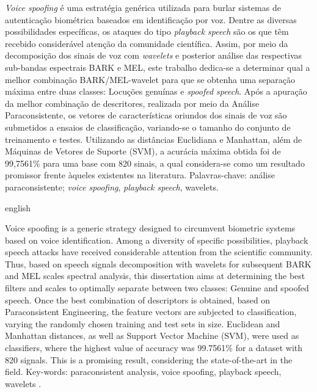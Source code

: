 \begin{resumo}
	\par \textit{Voice spoofing} é uma estratégia genérica utilizada para burlar sistemas de autenticação biométrica baseados em identificação por voz. Dentre as diversas possibilidades específicas, os ataques do tipo \textit{playback speech} são os que têm recebido considerável atenção da comunidade científica. Assim, por meio da decomposição dos sinais de voz com \textit{wavelets} e posterior análise das respectivas sub-bandas espectrais BARK e MEL, este trabalho dedica-se a determinar qual a melhor combinação BARK/MEL-wavelet para que se obtenha uma separação máxima entre duas classes: Locuções genuínas e \textit{spoofed speech}. Após a apuração da melhor combinação de descritores, realizada por meio da Análise Paraconsistente, os vetores de características oriundos dos sinais de voz são submetidos a ensaios de classificação, variando-se o tamanho do conjunto de treinamento e testes. Utilizando as distâncias Euclidiana e Manhattan, além de Máquinas de Vetores de Suporte (SVM), a acurácia máxima obtida foi de 99,7561\% para uma base com 820 sinais, a qual considera-se como um resultado promissor frente àqueles existentes na literatura.\newline\newline
	Palavras-chave: análise paraconsistente; \textit{voice spoofing}, \textit{playback speech}, wavelets.
\end{resumo}

\begin{resumo}[Abstract]
	\begin{otherlanguage*}{english}
		\par Voice spoofing is a generic strategy designed to circumvent biometric systems based on voice identification. Among a diversity of specific possibilities, playback speech attacks have received considerable attention from the scientific community. Thus, based on speech signals decomposition with wavelets for subsequent BARK and MEL scales spectral analysis, this dissertation aims at determining the best filters and scales to optimally separate between two classes: Genuine and spoofed speech. Once the best combination of descriptors is obtained, based on Paraconsistent Engineering, the feature vectors are subjected to classification, varying the randomly chosen training and test sets in size. Euclidean and Manhattan distances, as well as Support Vector Machine (SVM), were used as classifiers, where the highest value of accuracy was 99.7561\% for a dataset with 820 signals. This is a promising result, considering the state-of-the-art in the field. \newline\newline
		Key-words: paraconsistent analysis, voice spoofing, playback speech, wavelets .
	\end{otherlanguage*}
\end{resumo}
